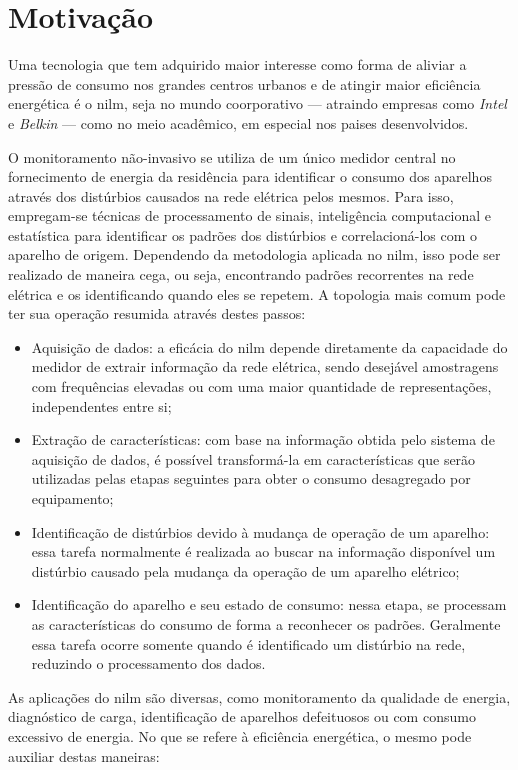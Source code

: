 \section{Motivação}

Uma tecnologia que tem adquirido maior interesse como forma de aliviar
a pressão de consumo nos grandes centros urbanos e de atingir maior
eficiência energética é o \gls{nilm}, seja no mundo coorporativo --- atraindo
empresas como \emph{Intel} e \emph{Belkin} --- como no meio acadêmico,
em especial nos paises desenvolvidos. 

O monitoramento não-invasivo se utiliza de um único medidor central no
fornecimento de energia da residência para identificar o consumo dos
aparelhos através dos distúrbios causados na rede elétrica pelos
mesmos. Para isso, empregam-se técnicas de processamento
de sinais, inteligência computacional e estatística para identificar
os padrões dos distúrbios e correlacioná-los com o aparelho de origem.
Dependendo da metodologia aplicada no \acs{nilm}, isso pode ser
realizado de maneira cega, ou seja, encontrando padrões recorrentes
na rede elétrica e os identificando quando eles se repetem.
A topologia mais comum pode ter sua operação resumida através destes
passos:

\begin{itemize}
\item Aquisição de dados: a eficácia do \acs{nilm} depende diretamente
da capacidade do medidor de extrair informação da rede elétrica, sendo
desejável amostragens com frequências elevadas ou com uma maior
quantidade de representações, independentes entre si;
\item Extração de características: com base na informação obtida pelo
sistema de aquisição de dados, é possível transformá-la em
características que serão utilizadas pelas etapas seguintes para obter
o consumo desagregado por equipamento;
\item Identificação de distúrbios devido à mudança de operação de um
aparelho: essa tarefa normalmente é realizada ao buscar na informação
disponível um distúrbio causado pela mudança da operação de um
aparelho elétrico;
\item Identificação do aparelho e seu estado de consumo: nessa etapa, se
processam as características do consumo de forma a reconhecer os
padrões. Geralmente essa tarefa ocorre somente quando é identificado
um distúrbio na rede, reduzindo o processamento dos dados.
\end{itemize}

As aplicações do \acs{nilm} são diversas, como monitoramento da
qualidade de energia, diagnóstico de carga, identificação de aparelhos
defeituosos ou com consumo excessivo de energia. No que se refere à
eficiência energética, o mesmo pode auxiliar destas maneiras:

